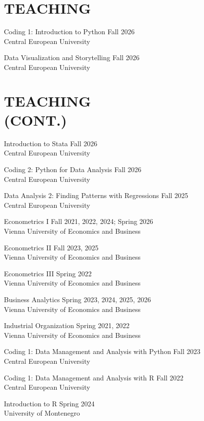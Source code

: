 \documentclass[margin]{res}
\begin{document}
\begin{resume}
\section{TEACHING}
Coding 1: Introduction to Python \hfill Fall 2026 \\
Central European University
\par
Data Visualization and Storytelling \hfill Fall 2026 \\
Central European University
\par
\newpage
\section{TEACHING\\(CONT.)}
Introduction to Stata \hfill Fall 2026 \\
Central European University
\par
Coding 2: Python for Data Analysis \hfill Fall 2026 \\
Central European University
\par
Data Analysis 2: Finding Patterns with Regressions \hfill Fall 2025 \\
Central European University
\par
Econometrics I \hfill Fall 2021, 2022, 2024; Spring 2026 \\
Vienna University of Economics and Business
\par
Econometrics II \hfill Fall 2023, 2025 \\
Vienna University of Economics and Business
\par
Econometrics III \hfill Spring 2022 \\
Vienna University of Economics and Business
\par
Business Analytics \hfill Spring 2023, 2024, 2025, 2026 \\
Vienna University of Economics and Business
\par
Industrial Organization \hfill Spring 2021, 2022 \\
Vienna University of Economics and Business
\par
Coding 1: Data Management and Analysis with Python \hfill Fall 2023 \\
Central European University
\par
Coding 1: Data Management and Analysis with R \hfill Fall 2022 \\
Central European University
\par
Introduction to R \hfill Spring 2024 \\
University of Montenegro
\par


\end{resume}
\end{document}
